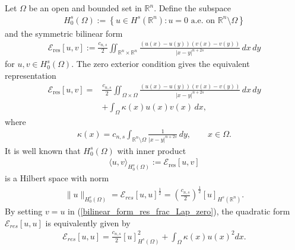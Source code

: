 \documentclass[preprint,12pt]{elsarticle}
\newcommand{\R}{\mathbb R}
\begin{document}
Let $\Omega$ be an open and bounded set in $\R^n$. Define the subspace 
\begin{align}\label{def_subsp_H_0}
    H^s_0(\Omega):=\left\{u\in H^s(\R^n):u=0 \mbox{ a.e. on }\R^n\setminus\Omega\right\}
\end{align} 
and the symmetric bilinear form
\begin{align}\label{bilinear_form_res_frac_Lap_full}
\mathcal E_{\mathrm{res}}[u,v]
:=
\frac{c_{n,s}}{2}
\iint_{\mathbb R^n\times\mathbb R^n}
\frac{(u(x)-u(y))(v(x)-v(y))}
{|x-y|^{n+2s}}\,dx\,dy
\end{align}
for \(u,v\in H_0^s(\Omega)\). The zero exterior condition gives the equivalent representation
\begin{align}\label{bilinear_form_res_frac_Lap_zero}
\mathcal E_{\mathrm{res}}[u,v]
={}&
\frac{c_{n,s}}{2}
\iint_{\Omega\times\Omega}
\frac{(u(x)-u(y))(v(x)-v(y))}
{|x-y|^{n+2s}}\,dx\,dy \nonumber\\
&+
\int_\Omega \kappa(x)u(x)v(x)\,dx,
\end{align}
where
\begin{align}
\kappa(x)
=
c_{n,s}
\int_{\mathbb R^n\setminus\Omega}
\frac{1}{|x-y|^{n+2s}}\,dy,
\qquad x\in\Omega.
\end{align}
It is well known that $H^s_0(\Omega)$ with inner product
\begin{align*}
    \langle u,v\rangle_{H^s_0(\Omega)}:=\mathcal E_{\mathrm{res}}[u,v]
\end{align*}
is a Hilbert space with norm
\begin{align}\label{Hs0_norm}
    \|u\|_{H^s_0(\Omega)}=\mathcal{E}_{res}[u, u]^{\frac{1}{2}}=\left(\frac{c_{n,s}}{2}\right)^{\frac{1}{2}}[u]_{H^s(\R^n)}.
\end{align} 
By setting $v=u$ in (\ref{bilinear_form_res_frac_Lap_zero}), the quadratic form  $\mathcal{E}_{res}[u,u]$ is equivalently given by
\begin{align}\label{bilinear_form_res_frac_Lap}
\mathcal{E}_{res}[u,u]=\frac{c_{n,s}}{2}[u]^2_{H^s(\Omega)}+\int_{\Omega}\kappa(x)u(x)^2dx.
\end{align} \cite[Sec. 2.1]{BBDG}
\end{document}
